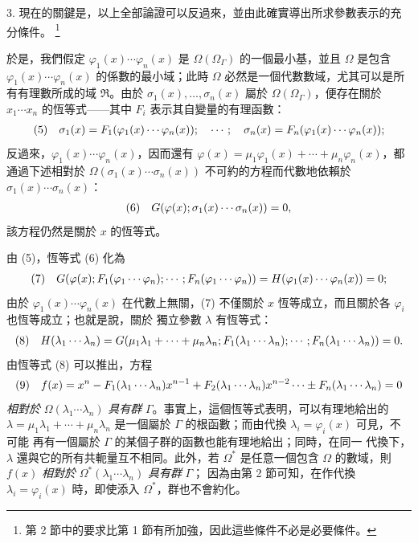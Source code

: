 \documentclass[11pt]{article}
\providecommand{\srcfn}[2]{%
  \begingroup
  \renewcommand{\thefootnote}{#1}%
  \footnote{#2}%
  \addtocounter{footnote}{-1}%
  \endgroup}
\begin{document}
3. 現在的關鍵是，以上全部論證可以反過來，並由此確實導出所求參數表示的充分條件。\srcfn{*)}{第 2 節中的要求比第 1 節有所加強，因此這些條件不必是必要條件。}於是，我們假定 $\varphi_1(x)\cdots\varphi_n(x)$ 是 $\Omega(\Omega_\Gamma)$ 的一個最小基，並且 $\Omega$ 是包含 $\varphi_1(x)\cdots\varphi_n(x)$ 的係數的最小域；此時 $\Omega$ 必然是一個代數數域，尤其可以是所有有理數所成的域 $\mathfrak R$。由於 $\sigma_1(x),\ldots,\sigma_n(x)$ 屬於 $\Omega(\Omega_\Gamma)$，便存在關於 $x_1\cdots x_n$ 的恆等式——其中 $F_i$ 表示其自變量的有理函數：
\[
\begin{array}{@{}l@{\quad}l@{}}
(5)& \displaystyle \sigma_1(x)=F_1(\varphi_1(x)\cdots\varphi_n(x));\quad \cdots;\quad \sigma_n(x)=F_n(\varphi_1(x)\cdots\varphi_n(x));
\end{array}
\]
反過來，$\varphi_1(x)\cdots\varphi_n(x)$，因而還有 $\varphi(x)=\mu_1\varphi_1(x)+\cdots+\mu_n\varphi_n(x)$，都通過下述相對於 $\Omega(\sigma_1(x)\cdots\sigma_n(x))$ 不可約的方程而代數地依賴於 $\sigma_1(x)\cdots\sigma_n(x)$：
\[
\begin{array}{@{}l@{\quad}l@{}}
(6)& \displaystyle G(\varphi(x);\sigma_1(x)\cdots\sigma_n(x))=0,
\end{array}
\]
該方程仍然是關於 $x$ 的恆等式。

由 (5)，恆等式 (6) 化為
\[
\begin{array}{@{}l@{\quad}l@{}}
(7)& \displaystyle G(\varphi(x);F_1(\varphi_1\cdots\varphi_n);\cdots;F_n(\varphi_1\cdots\varphi_n)) =H(\varphi_1(x)\cdots\varphi_n(x))=0;
\end{array}
\]
由於 $\varphi_1(x)\cdots\varphi_n(x)$ 在代數上無關，(7) 不僅關於
$x$ 恆等成立，而且關於各 $\varphi_i$ 也恆等成立；也就是說，關於
獨立參數 $\lambda$ 有恆等式：
\[
\begin{array}{@{}l@{\quad}l@{}}
(8)& \displaystyle H(\lambda_1\cdots\lambda_n)=G(\mu_1\lambda_1+\cdots+\mu_n\lambda_n;F_1(\lambda_1\cdots\lambda_n);\cdots;F_n(\lambda_1\cdots\lambda_n))=0.
\end{array}
\]
由恆等式 (8) 可以推出，方程
\[
\begin{array}{@{}l@{\quad}l@{}}
(9)& \displaystyle f(x)=x^n-F_1(\lambda_1\cdots\lambda_n)x^{n-1}+F_2(\lambda_1\cdots\lambda_n)x^{n-2}\cdots\pm F_n(\lambda_1\cdots\lambda_n)=0
\end{array}
\]
\emph{相對於} $\Omega(\lambda_1\cdots\lambda_n)$ \emph{具有群}
$\Gamma$。事實上，這個恆等式表明，可以有理地給出的
$\lambda=\mu_1\lambda_1+\cdots+\mu_n\lambda_n$ 是一個屬於
$\Gamma$ 的根函數；而由代換 $\lambda_i=\varphi_i(x)$ 可見，不可能
再有一個屬於 $\Gamma$ 的某個子群的函數也能有理地給出；同時，在同一
代換下，$\lambda$ 還與它的所有共軛量互不相同。此外，若 $\Omega^*$
是任意一個包含 $\Omega$ 的數域，則 $f(x)$ \emph{相對於}
$\Omega^*(\lambda_1\cdots\lambda_n)$ \emph{具有群} $\Gamma$；
因為由第 2 節可知，在作代換 $\lambda_i=\varphi_i(x)$ 時，即使添入
$\Omega^*$，群也不會約化。
\end{document}
